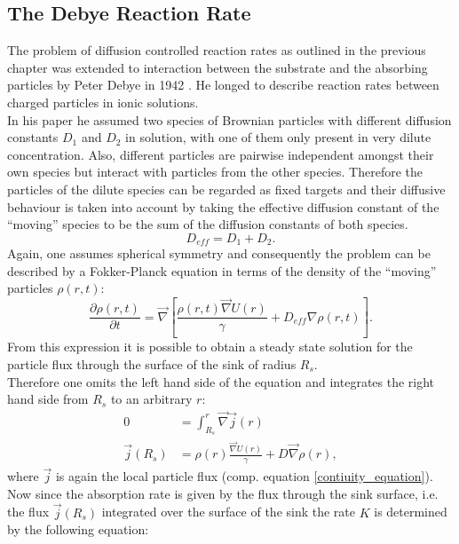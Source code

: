 \subsection{The Debye Reaction Rate}
\label{The_Debye_Reaction_Rate}
The problem of diffusion controlled reaction rates as outlined in the previous chapter was extended to interaction between the substrate and the absorbing particles by Peter Debye in 1942 \cite{Debye1942}. He longed to describe reaction rates between charged particles in ionic solutions. \\
In his paper he assumed two species of Brownian particles with different diffusion constants $D_{1}$ and $D_{2}$ in solution, with one of them only present in very dilute concentration. Also, different particles are pairwise independent amongst their own species but interact with particles from the other species. Therefore the particles of the dilute species can be regarded as fixed targets and their diffusive behaviour is taken into account by taking the effective diffusion constant of the ``moving'' species to be the sum of the diffusion constants of both species. 
\begin{equation}
    D_{eff} = D_{1} + D_{2}.
\end{equation}
Again, one assumes spherical symmetry and consequently the problem can be described by a Fokker-Planck equation in terms of the density of the ``moving'' particles $\rho(r,t)$:
\begin{equation}
    \frac{\partial \rho(r,t)}{\partial t} = \vec \nabla \left[ \frac{\rho(r,t)\vec \nabla U(r)}{\gamma} + D_{eff} \nabla \rho(r,t) \right].
    \label{fpe_debye}
\end{equation}
From this expression it is possible to obtain a steady state solution for the particle flux through the surface of the sink of radius $R_s$. \\
Therefore one omits the left hand side of the equation and integrates the right hand side from $R_s$ to an arbitrary $r$:
\begin{align}
    0 &= \int_{R_s}^{r} \vec \nabla \vec j(r) \nonumber \\
    \vec j(R_s) &=  \rho(r)\frac{\vec \nabla U(r)}{\gamma} + D \vec \nabla \rho(r),
\end{align}
where $\vec{j}$ is again the local particle flux (comp. equation \eqref{contiuity_equation}).\\ Now since the absorption rate is given by the flux through the sink surface, i.e. the flux $\vec j (R_s)$ integrated over the surface of the sink the rate $K$ is determined by the following equation:
